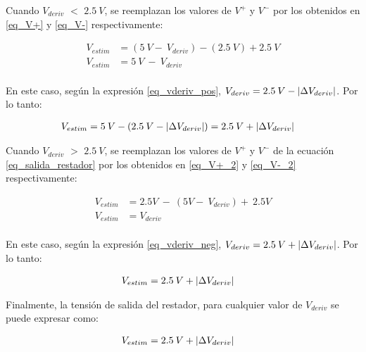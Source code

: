 Cuando $V_{deriv}$ $\mathrm{<}$ $2.5\:V$, se reemplazan los valores de $V^+$ y $V^-$ por los obtenidos en \ref{eq_V+} y \ref{eq_V-} respectivamente:

\begin{equation*} 
	\begin{aligned}
		V_{estim}&=(5\:V -\ V_{deriv})-(2.5\: V)+2.5\:V\\
		V_{estim}&=5\: V\ -\ V_{deriv}\\ 
	\end{aligned}
\end{equation*}

En este caso,  según la expresión \ref{eq_vderiv_pos}, $V_{deriv} = 2.5\:V - \lvert\Delta V_{deriv}\rvert$. Por lo tanto:

\begin{equation*} 
	\begin{aligned}
		V_{estim}&=5\:V -(2.5\:V - \lvert\Delta V_{deriv}\rvert) = 2.5\:V + \lvert\Delta V_{deriv}\rvert		
	\end{aligned}
\end{equation*}

Cuando $V_{deriv}$ $\mathrm{>}$ $2.5\:V$, se reemplazan los valores de $V^+$ y $V^-$ de la ecuación \ref{eq_salida_restador} por los obtenidos en \ref{eq_V+_2} y \ref{eq_V-_2} respectivamente:

\begin{equation*} 
	\begin{aligned}
		V_{estim}&=2.5V\ -\ (5V-\ V_{deriv})+\ 2.5V\\
		V_{estim}&=V_{deriv}\\
	\end{aligned}
\end{equation*}

En este caso,  según la expresión \ref{eq_vderiv_neg}, $V_{deriv} = 2.5\:V + \lvert\Delta V_{deriv}\rvert$. Por lo tanto:

\begin{equation*} 
	\begin{aligned}
		V_{estim}&=2.5\:V + \lvert\Delta V_{deriv}\rvert		
	\end{aligned}
\end{equation*}

Finalmente, la tensión de salida del restador, para cualquier valor de $V_{deriv}$ se puede expresar como:

\begin{equation*} 
	\begin{aligned}
		V_{estim}&=2.5\:V + \lvert\Delta V_{deriv}\rvert		
	\end{aligned}
\end{equation*}

